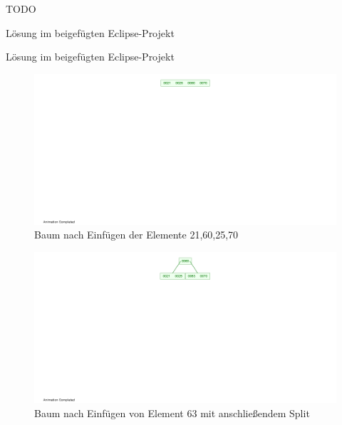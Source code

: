 \documentclass[12pt]{scrartcl}
\begin{document}

\exercise{}
TODO

\exercise{}
Lösung im beigefügten Eclipse-Projekt

\exercise{}
Lösung im beigefügten Eclipse-Projekt

\exercise{}

\begin{figure}[h!]
\begin{center}
\includegraphics[scale=1]{B-Tree1.png}
\caption{Baum nach Einfügen der Elemente 21,60,25,70}
\end{center}
\end{figure}

\begin{figure}[h!]
\begin{center}
\includegraphics[scale=1]{B-Tree2.png}
\caption{Baum nach Einfügen von Element 63 mit anschließendem Split}
\end{center}
\end{figure}
\end{document}
